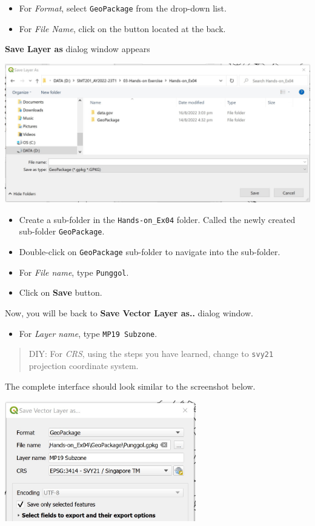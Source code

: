 \documentclass[
  letterpaper,
  DIV=11,
  numbers=noendperiod]{scrreprt}
\providecommand{\tightlist}{%
  \setlength{\itemsep}{0pt}\setlength{\parskip}{0pt}}\usepackage{longtable,booktabs,array}
\begin{document}
\begin{itemize}
\item
  For \emph{Format}, select \texttt{GeoPackage} from the drop-down list.
\item
  For \emph{File Name}, click on the button located at the back.
\end{itemize}

\textbf{Save Layer as} dialog window appears

\includegraphics{./img04/image16.jpg}

\begin{itemize}
\item
  Create a sub-folder in the \texttt{Hands-on\_Ex04} folder. Called the
  newly created sub-folder \texttt{GeoPackage}.
\item
  Double-click on \texttt{GeoPackage} sub-folder to navigate into the
  sub-folder.
\item
  For \emph{File name}, type \texttt{Punggol}.
\item
  Click on \textbf{Save} button.
\end{itemize}

Now, you will be back to \textbf{Save Vector Layer as..} dialog window.

\begin{itemize}
\tightlist
\item
  For \emph{Layer name}, type \texttt{MP19\ Subzone}.
\end{itemize}

\begin{quote}
DIY: For \emph{CRS}, using the steps you have learned, change to
\texttt{svy21} projection coordinate system.
\end{quote}

The complete interface should look similar to the screenshot below.

\includegraphics[width=3.28125in,height=\textheight]{./img04/image17.jpg}
\end{document}

